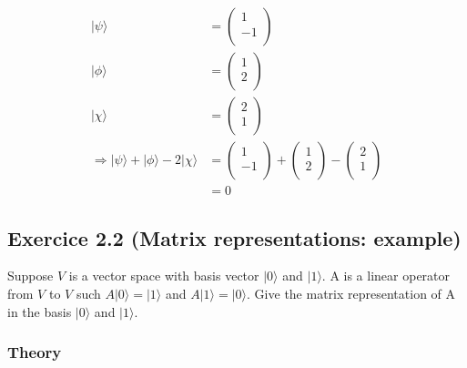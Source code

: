 \documentclass{article}
\begin{document}
\begin{equation}
    \begin{split}
        |\psi\rangle & = \begin{pmatrix}
            1 \\
            -1 \\
        \end{pmatrix} \\
        |\phi\rangle & = \begin{pmatrix}
            1 \\
            2 \\
        \end{pmatrix} \\
        |\chi\rangle & = \begin{pmatrix}
            2 \\
            1 \\
        \end{pmatrix} \\
        \Longrightarrow |\psi\rangle + |\phi\rangle - 2|\chi\rangle & = \begin{pmatrix}
            1 \\
            -1 \\
        \end{pmatrix} + \begin{pmatrix}
            1 \\
            2 \\
        \end{pmatrix} - \begin{pmatrix}
            2 \\
            1 \\
        \end{pmatrix} \\
        & = 0
    \end{split}
\end{equation}

\subsection{Exercice 2.2 (Matrix representations: example)}

Suppose $V$ is a vector space with basis vector $|0\rangle$ and $|1\rangle$.
A is a linear operator from $V$ to $V$ such $A|0\rangle = |1\rangle$ and 
$A|1\rangle = |0\rangle$. Give the matrix representation of A in the basis
$|0\rangle$ and $|1\rangle$.

\subsubsection{Theory}
\end{document}
